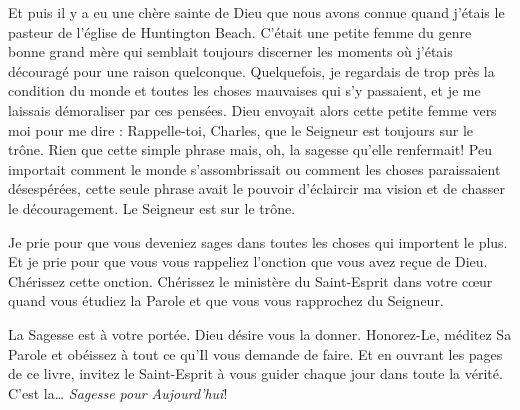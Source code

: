 Et puis il y a eu une chère sainte de Dieu que nous avons connue quand
 j'étais le pasteur de l'église de Huntington Beach.
 C'était une petite femme du genre bonne grand mère qui semblait
 toujours discerner les moments où j'étais découragé
 pour une raison quelconque. Quelquefois, je regardais de trop près la
 condition du monde et toutes les choses mauvaises qui s'y passaient,
 et je me laissais démoraliser par ces pensées.
 Dieu envoyait alors cette petite femme vers moi pour me dire
 : \Og Rappelle-toi, Charles, que le Seigneur est toujours
 sur le trône. \Fg{}
 Rien que cette simple phrase mais, oh, la sagesse qu'elle renfermait!
 Peu importait comment le monde s'assombrissait ou comment les choses
 paraissaient désespérées, cette seule phrase avait le pouvoir d'éclaircir
 ma vision et de chasser le découragement.
 \Og Le Seigneur est sur le trône. \Fg{}

Je prie pour que vous deveniez sages dans toutes les choses qui importent
 le plus. Et je prie pour que vous vous rappeliez l'onction que vous avez
 re\c{c}ue de Dieu. Chérissez cette onction. Chérissez le ministère du
 Saint-Esprit dans votre c\oe{}ur quand vous étudiez la Parole
 et que vous vous rapprochez du Seigneur.

La Sagesse est à votre portée. Dieu désire vous la donner.
 Honorez-Le,
 méditez Sa Parole et obéissez à tout ce qu'Il vous demande de faire.
 Et en ouvrant les pages de ce livre, invitez le Saint-Esprit à vous guider
 chaque jour dans toute la vérité.
 C'est la\dots{} \emph{Sagesse pour Aujourd'hui}!

\signature{Chuck Smith}

